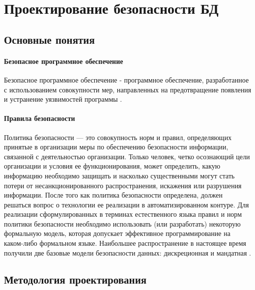 \section{Проектирование безопасности БД}

\subsection{Основные понятия}

\paragraph{Безопасное программное обеспечение}
Безопасное программное обеспечение - программное обеспечение, разработанное с использованием совокупности
мер, направленных на предотвращение появления и устранение уязвимостей программы \autocite[с. 2]{GOST50939}.

\paragraph{Правила безопасности}
Политика безопасности — это совокупность норм и правил, определяющих принятые в организации меры по
обеспечению безопасности информации, связанной с деятельностью организации. Только человек, четко
осознающий цели организации и условия ее функционирования, может определить, какую информацию
необходимо защищать и насколько существенными могут стать потери от несанкционированного
распространения, искажения или разрушения информации. После того как политика безопасности
определена, должен решаться вопрос о технологии ее реализации в автоматизированном контуре.
Для реализации сформулированных в терминах естественного языка правил и норм политики
безопасности необходимо использовать (или разработать) некоторую формальную модель,
которая допускает эффективное программирование на каком-либо формальном языке.
Наибольшее распространение в настоящее время получили две базовые модели безопасности
данных: дискреционная и мандатная \autocite{security-policy_13}.

\subsection{Методология проектирования}

